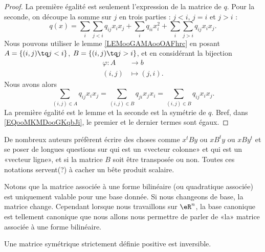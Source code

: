 \begin{proof}
	La première égalité est seulement l'expression de la matrice de \( q\). Pour la seconde, on découpe la somme sur \( j\) en trois parties : \( j<i\), \( j=i\) et \( j>i\) :
	\begin{equation}		\label{EQooMKMDooGKqbJi}
		q(x)=\sum_i\sum_{j<i}q_{ij}x_ix_j+\sum_iq_{ii}x_i^2+\sum_i\sum_{j>i}q_{ij}x_ix_j.
	\end{equation}
	Nous pouvons utiliser le lemme \ref{LEMooGAMAooOAFhrc} en posant \( A=\{ (i,j)\tq j<i \}\), \( B=\{ (i,j)\tq j>i \}\), et en considérant la bijection
	\begin{equation}
		\begin{aligned}
			\varphi\colon A & \to b          \\
			(i,j)           & \mapsto (j,i).
		\end{aligned}
	\end{equation}
	Nous avons alors
	\begin{equation}
		\sum_{(i,j)\in A}q_{ij}x_ix_j=\sum_{(i,j)\in B}q_{ji}x_jx_i=\sum_{(i,j)\in B}q_{ij}x_ix_j.
	\end{equation}
	La première égalité est le lemme et la seconde est la symétrie de \( q\). Bref, dans \eqref{EQooMKMDooGKqbJi}, le premier et le dernier termes sont égaux.
\end{proof}

\begin{normaltext}
	De nombreux auteurs préfèrent écrire des choses comme \( x^tBy\) ou \( xB^ty\) ou \( xBy^t\) et se poser de longues questions sur qui est un «vecteur colonne» et qui est un «vecteur ligne», et si la matrice \( B\) soit être transposée ou non. Toutes ces notations servent(?) à cacher un bête produit scalaire.
\end{normaltext}

\begin{normaltext}
	Notons que la matrice associée à une forme bilinéaire (ou quadratique associée) est uniquement valable pour une base donnée. Si nous changeons de base, la matrice change. Cependant lorsque nous travaillons sur \( \eR^n\), la base canonique est tellement canonique que nous allons nous permettre de parler de «la» matrice associée à une forme bilinéaire.
\end{normaltext}

\begin{corollary}
	Une matrice symétrique strictement définie positive est inversible.
\end{corollary}

